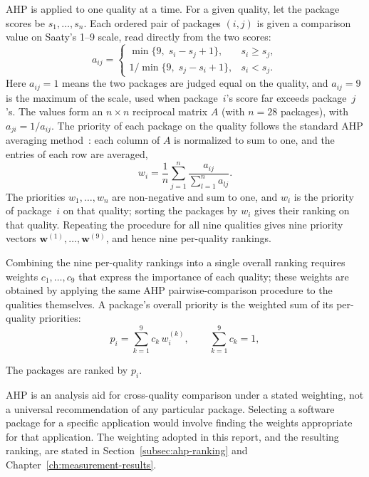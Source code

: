 AHP is applied to one quality at a time. For a given quality, let the package scores be $s_1,\dots,s_n$. Each ordered pair of packages $(i,j)$ is given a comparison value on Saaty's 1--9 scale, read directly from the two scores:
\begin{equation}
a_{ij} =
\begin{cases}
\min\{9,\; s_i - s_j + 1\}, & s_i \ge s_j,\\[4pt]
1 \big/ \min\{9,\; s_j - s_i + 1\}, & s_i < s_j.
\end{cases}
\label{eq:ahp-pairwise}
\end{equation}
Here $a_{ij} = 1$ means the two packages are judged equal on the quality, and $a_{ij} = 9$ is the maximum of the scale, used when package~$i$'s score far exceeds package~$j$'s. The values form an $n \times n$ reciprocal matrix $A$ (with $n = 28$ packages), with $a_{ji} = 1/a_{ij}$. The priority of each package on the quality follows the standard AHP averaging method~\citep{Saaty1980}: each column of $A$ is normalized to sum to one, and the entries of each row are averaged,
\begin{equation}
w_i = \frac{1}{n} \sum_{j=1}^{n} \frac{a_{ij}}{\sum_{l=1}^{n} a_{lj}}.
\label{eq:ahp-priority}
\end{equation}
The priorities $w_1,\dots,w_n$ are non-negative and sum to one, and $w_i$ is the priority of package~$i$ on that quality; sorting the packages by $w_i$ gives their ranking on that quality. Repeating the procedure for all nine qualities gives nine priority vectors $\mathbf{w}^{(1)},\dots,\mathbf{w}^{(9)}$, and hence nine per-quality rankings.

Combining the nine per-quality rankings into a single overall ranking requires weights $c_1,\dots,c_9$ that express the importance of each quality; these weights are obtained by applying the same AHP pairwise-comparison procedure to the qualities themselves. A package's overall priority is the weighted sum of its per-quality priorities:
\begin{equation}
p_i = \sum_{k=1}^{9} c_k\, w_i^{(k)},
\qquad \sum_{k=1}^{9} c_k = 1,
\label{eq:ahp-aggregate}
\end{equation}

The packages are ranked by $p_i$.

AHP is an analysis aid for cross-quality comparison under a stated weighting, not a universal recommendation of any particular package. Selecting a software package for a specific application would involve finding the weights appropriate for that application. The weighting adopted in this report, and the resulting ranking, are stated in Section~\ref{subsec:ahp-ranking} and Chapter~\ref{ch:measurement-results}.

